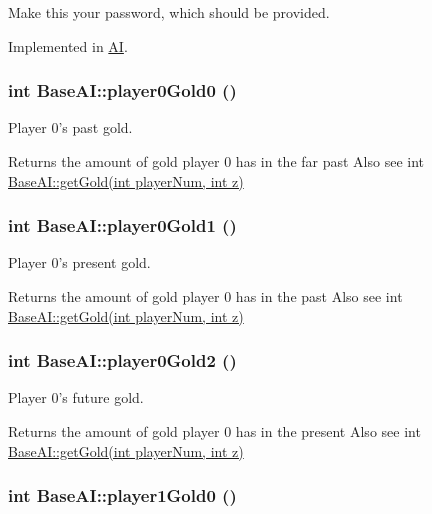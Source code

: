 Make this your password, which should be provided. 

Implemented in \hyperlink{classAI_a4e58e11bbbdb040e6b12f8706763a00}{AI}.\hypertarget{classBaseAI_e350c70cf7c368175a418a8fd8c29eba}{
\subsubsection[{player0Gold0}]{\setlength{\rightskip}{0pt plus 5cm}int BaseAI::player0Gold0 ()}}
\label{classBaseAI_e350c70cf7c368175a418a8fd8c29eba}


Player 0's past gold. 

Returns the amount of gold player 0 has in the far past Also see int \hyperlink{classBaseAI_c079405ee4fd5cec789af0f627d3d175}{BaseAI::getGold(int playerNum, int z)} \hypertarget{classBaseAI_55de649fba1edb2c8a316070a4041f16}{
\subsubsection[{player0Gold1}]{\setlength{\rightskip}{0pt plus 5cm}int BaseAI::player0Gold1 ()}}
\label{classBaseAI_55de649fba1edb2c8a316070a4041f16}


Player 0's present gold. 

Returns the amount of gold player 0 has in the past Also see int \hyperlink{classBaseAI_c079405ee4fd5cec789af0f627d3d175}{BaseAI::getGold(int playerNum, int z)} \hypertarget{classBaseAI_5ea60d2c86f1e4457bef7963a3d0afce}{
\subsubsection[{player0Gold2}]{\setlength{\rightskip}{0pt plus 5cm}int BaseAI::player0Gold2 ()}}
\label{classBaseAI_5ea60d2c86f1e4457bef7963a3d0afce}


Player 0's future gold. 

Returns the amount of gold player 0 has in the present Also see int \hyperlink{classBaseAI_c079405ee4fd5cec789af0f627d3d175}{BaseAI::getGold(int playerNum, int z)} \hypertarget{classBaseAI_f82cc7bd092d0636eb8a8df82a0c5b49}{
\subsubsection[{player1Gold0}]{\setlength{\rightskip}{0pt plus 5cm}int BaseAI::player1Gold0 ()}}
\label{classBaseAI_f82cc7bd092d0636eb8a8df82a0c5b49}


